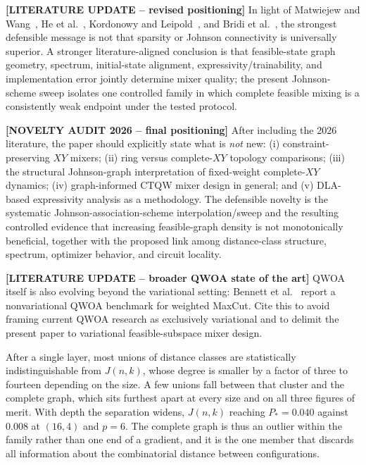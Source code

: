 {\color{red}\textbf{[LITERATURE UPDATE -- revised positioning]} In light of Matwiejew and Wang~\cite{Matwiejew2024}, He et al.~\cite{He2023}, Kordonowy and Leipold~\cite{Kordonowy2026}, and Bridi et al.~\cite{Bridi2026Expressivity}, the strongest defensible message is not that sparsity or Johnson connectivity is universally superior. A stronger literature-aligned conclusion is that feasible-state graph geometry, spectrum, initial-state alignment, expressivity/trainability, and implementation error jointly determine mixer quality; the present Johnson-scheme sweep isolates one controlled family in which complete feasible mixing is a consistently weak endpoint under the tested protocol.}

{\color{red}\textbf{[NOVELTY AUDIT 2026 -- final positioning]} After including the 2026 literature, the paper should explicitly state what is \emph{not} new: (i) constraint-preserving $XY$ mixers; (ii) ring versus complete-$XY$ topology comparisons; (iii) the structural Johnson-graph interpretation of fixed-weight complete-$XY$ dynamics; (iv) graph-informed CTQW mixer design in general; and (v) DLA-based expressivity analysis as a methodology. The defensible novelty is the systematic Johnson-association-scheme interpolation/sweep and the resulting controlled evidence that increasing feasible-graph density is not monotonically beneficial, together with the proposed link among distance-class structure, spectrum, optimizer behavior, and circuit locality.}

{\color{red}\textbf{[LITERATURE UPDATE -- broader QWOA state of the art]} QWOA itself is also evolving beyond the variational setting: Bennett et al.~\cite{Bennett2026Nonvariational} report a nonvariational QWOA benchmark for weighted MaxCut. Cite this to avoid framing current QWOA research as exclusively variational and to delimit the present paper to variational feasible-subspace mixer design.}

After a single layer, most unions of distance classes are statistically
indistinguishable from $J(n,k)$, whose degree is smaller by a factor of
three to fourteen depending on the size. A few unions fall between that
cluster and the complete graph, which sits furthest apart at every size and
on all three figures of merit. With depth the separation widens, $J(n,k)$
reaching $P_*=0.040$ against $0.008$ at $(16,4)$ and $p=6$. The complete
graph is thus an outlier within the family rather than one end of a
gradient, and it is the one member that discards all information about the
combinatorial distance between configurations.

